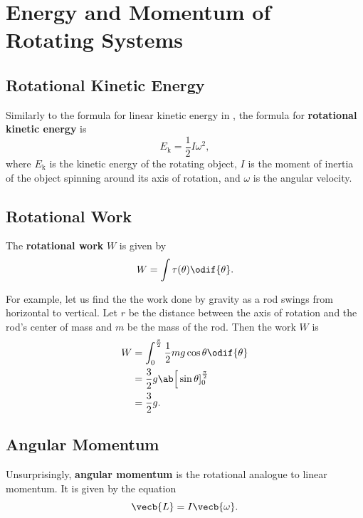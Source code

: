 \chapter{Energy and Momentum of Rotating Systems}


\section{Rotational Kinetic Energy}

Similarly to the formula for linear kinetic energy in
,
the formula for \textbf{rotational kinetic energy} is
\begin{equation}
    E_\mathrm{k} = \frac{1}{2} I \omega^2,
\end{equation}
where \(E_\mathrm{k}\) is the kinetic energy of the rotating object,
\(I\) is the moment of inertia of the object spinning around its axis
of rotation,
and \(\omega\) is the angular velocity.

\section{Rotational Work}

The \textbf{rotational work} \(W\) is given by
\begin{equation}
    W = \int \tau(\theta) \odif{\theta}.
\end{equation}

For example, let us find the the work done by gravity
as a rod swings from horizontal to vertical.
Let \(r\) be the distance between the axis of rotation and the rod's
center of mass
and \(m\) be the mass of the rod.
Then the work \(W\) is
\begin{equation}
    \begin{aligned}
        W &= \int_0^\frac{\pi}{2} \frac{1}{2} m g \cos\theta \odif{\theta} \\
        &= \frac{3}{2} g \ab\Big[ \sin\theta ]_0^\frac{\pi}{2} \\
        &= \frac{3}{2} g.
    \end{aligned}
\end{equation}

\section{Angular Momentum}

Unsurprisingly, \textbf{angular momentum} is the rotational analogue
to linear momentum.
It is given by the equation
\begin{equation}
    \vecb{L} = I \vecb{\omega}.
\end{equation}

